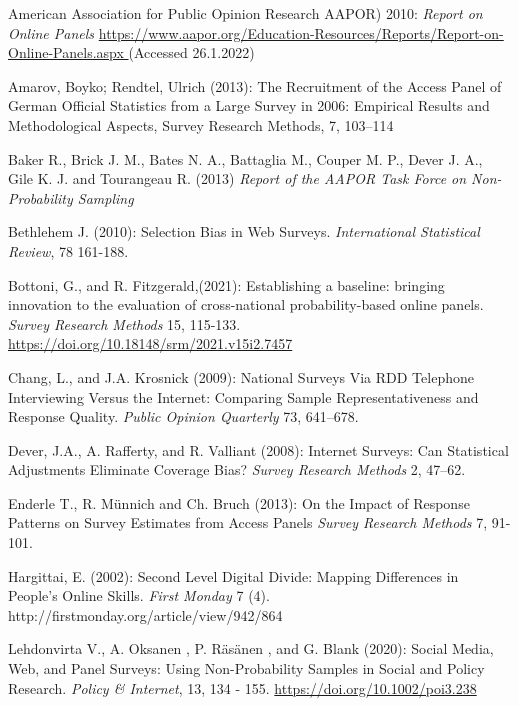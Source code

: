 \documentclass[a4paper , 11pt]{article}
\begin{document}
\begin{description}


\item American Association for Public Opinion Research AAPOR) 2010: \textit{Report on Online Panels} \url{https://www.aapor.org/Education-Resources/Reports/Report-on-Online-Panels.aspx } (Accessed 26.1.2022)

\item  Amarov, Boyko; Rendtel, Ulrich (2013): The Recruitment of the Access Panel of German Official Statistics from
a Large Survey in 2006: Empirical Results and Methodological Aspects, Survey Research Methods, 7, 103--114

\item Baker R., Brick J. M., Bates N. A., Battaglia M., Couper M. P., Dever J. A., Gile K. J. and Tourangeau R. (2013) \textit{Report of the AAPOR Task Force on Non-Probability Sampling}

\item Bethlehem J. (2010): Selection Bias in Web Surveys. \textit{International Statistical Review}, 78 161-188.

\item Bottoni, G., and R. Fitzgerald,(2021): Establishing a baseline: bringing innovation to the evaluation of cross-national probability-based online panels. \textit{Survey Research Methods} 15, 115-133. \url{https://doi.org/10.18148/srm/2021.v15i2.7457}

\item Chang, L., and J.A. Krosnick (2009): National Surveys Via RDD Telephone Interviewing Versus the
Internet: Comparing Sample Representativeness and Response Quality. \textit{ Public Opinion Quarterly}
73, 641–678.

\item Dever, J.A., A. Rafferty, and R. Valliant (2008): Internet Surveys: Can Statistical Adjustments Eliminate
Coverage Bias?  \textit{Survey Research Methods} 2, 47–62.

  \item Enderle T., R. Münnich and Ch. Bruch (2013): On the Impact of Response Patterns on Survey Estimates from Access Panels \textit{Survey Research Methods} 7, 91-101.
      
  \item Hargittai, E. (2002): Second Level Digital Divide: Mapping Differences in People's Online Skills. \textit{First
Monday} 7 (4). http://firstmonday.org/article/view/942/864    


\item Lehdonvirta V., A. Oksanen , P. Räsänen , and G. Blank (2020): Social Media, Web, and Panel Surveys: Using
Non-Probability Samples in Social and Policy Research. \textit{Policy \& Internet}, 13, 134 - 155.  \url{https://doi.org/10.1002/poi3.238}


\end{description}
\end{document}
